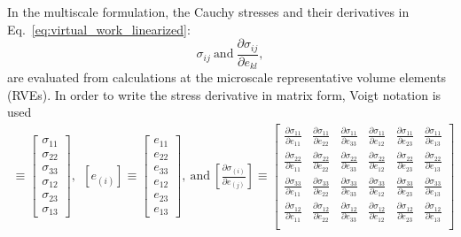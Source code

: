 \documentclass[12pt,aps,pre]{revtex4}
\begin{document}
In the multiscale formulation, the Cauchy stresses and their derivatives in Eq.\ \eqref{eq:virtual_work_linearized}:
%
\begin{equation}
\sigma_{ij} \ \text{and} \ \frac{\partial \sigma_{ij}}{\partial e_{kl}},
\label{eq:sigma_terms}
\end{equation}
%
are evaluated from calculations at the microscale representative volume elements (RVEs). In order to write the stress derivative in matrix form, Voigt notation is used 
%
\begin{eqnarray}
[\sigma_{(i)}] \equiv 
\begin{bmatrix}
\sigma_{11} \\ \sigma_{22} \\ \sigma_{33} \\ \sigma_{12} \\ \sigma_{23} \\ \sigma_{13}
\end{bmatrix} , \ \
%
[e_{(i)}] \equiv
\begin{bmatrix}
e_{11} \\ e_{22} \\ e_{33} \\ e_{12} \\ e_{23} \\ e_{13} 
\end{bmatrix}, \ \text{and} \
%
\left[ \frac{\partial \sigma_{(i)}}{\partial e_{(j)}} \right] \equiv 
\begin{bmatrix}
\frac{\partial \sigma_{11}}{\partial e_{11}} & \frac{\partial \sigma_{11}}{\partial e_{22}} & \frac{\partial \sigma_{11}}{\partial e_{33}} & \frac{\partial \sigma_{11}}{\partial e_{12}} & \frac{\partial \sigma_{11}}{\partial e_{23}} & \frac{\partial \sigma_{11}}{\partial e_{13}} \\
%
\frac{\partial \sigma_{22}}{\partial e_{11}} & \frac{\partial \sigma_{22}}{\partial e_{22}} & \frac{\partial \sigma_{22}}{\partial e_{33}} & \frac{\partial \sigma_{22}}{\partial e_{12}} & \frac{\partial \sigma_{22}}{\partial e_{23}} & \frac{\partial \sigma_{22}}{\partial e_{13}} \\
%
\frac{\partial \sigma_{33}}{\partial e_{11}} & \frac{\partial \sigma_{33}}{\partial e_{22}} & \frac{\partial \sigma_{33}}{\partial e_{33}} & \frac{\partial \sigma_{33}}{\partial e_{12}} & \frac{\partial \sigma_{33}}{\partial e_{23}} & \frac{\partial \sigma_{33}}{\partial e_{13}} \\
%
\frac{\partial \sigma_{12}}{\partial e_{11}} & \frac{\partial \sigma_{12}}{\partial e_{22}} & \frac{\partial \sigma_{12}}{\partial e_{33}} & \frac{\partial \sigma_{12}}{\partial e_{12}} & \frac{\partial \sigma_{12}}{\partial e_{23}} & \frac{\partial \sigma_{12}}{\partial e_{13}} \\

\end{bmatrix}
\end{eqnarray}
\end{document}
